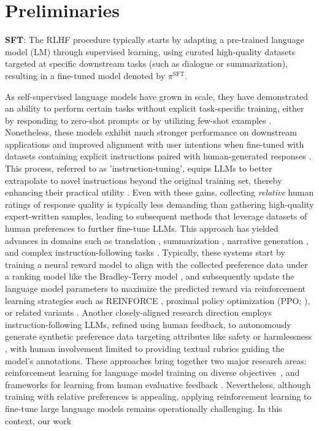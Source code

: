 \section{Preliminaries}\label{section:prelims}

\textbf{SFT}: The RLHF procedure typically starts by adapting a pre-trained language model (LM) through supervised learning, using curated high-quality datasets targeted at specific downstream tasks (such as dialogue or summarization), resulting in a fine-tuned model denoted by $\pi^\text{SFT}$.

As self-supervised language models have grown in scale, they have demonstrated an ability to perform certain tasks without explicit task-specific training, either by responding to zero-shot prompts \citep{radford2019language} or by utilizing few-shot examples \citep{gpt3,megatron,chowdhery2022palm}. Nonetheless, these models exhibit much stronger performance on downstream applications and improved alignment with user intentions when fine-tuned with datasets containing explicit instructions paired with human-generated responses \citep{mishra-etal-2022-cross,sanh2022multitask,chung2022scaling,thoppilan2022lamda}. This process, referred to as 'instruction-tuning', equips LLMs to better extrapolate to novel instructions beyond the original training set, thereby enhancing their practical utility \citep{chung2022scaling}. Even with these gains, collecting \textit{relative} human ratings of response quality is typically less demanding than gathering high-quality expert-written samples, leading to subsequent methods that leverage datasets of human preferences to further fine-tune LLMs. This approach has yielded advances in domains such as translation \citep{kreutzer-etal-2018-reliability}, summarization \citep{stiennon2022learning,ziegler2020finetuning}, narrative generation \citep{ziegler2020finetuning}, and complex instruction-following tasks \citep{ouyang2022training,ramamurthy2023is}. Typically, these systems start by training a neural reward model to align with the collected preference data under a ranking model like the Bradley-Terry model \citep{bradley1952rankanalysis}, and subsequently update the language model parameters to maximize the predicted reward via reinforcement learning strategies such as REINFORCE \citep{williams1992reinforce}, proximal policy optimization (PPO; \cite{schulman2017proximal}), or related variants \citep{ramamurthy2023is}. Another closely-aligned research direction employs instruction-following LLMs, refined using human feedback, to autonomously generate synthetic preference data targeting attributes like safety or harmlessness \citep{bai2022constitutional}, with human involvement limited to providing textual rubrics guiding the model’s annotations. These approaches bring together two major research areas: reinforcement learning for language model training on diverse objectives~\citep{Ranzato2015SequenceLT,paulus2018a,wu2018learning}, and frameworks for learning from human evaluative feedback \citep{christiano2017deep,kupcsik2018learning}. Nevertheless, although training with relative preferences is appealing, applying reinforcement learning to fine-tune large language models remains operationally challenging. In this context, our work 